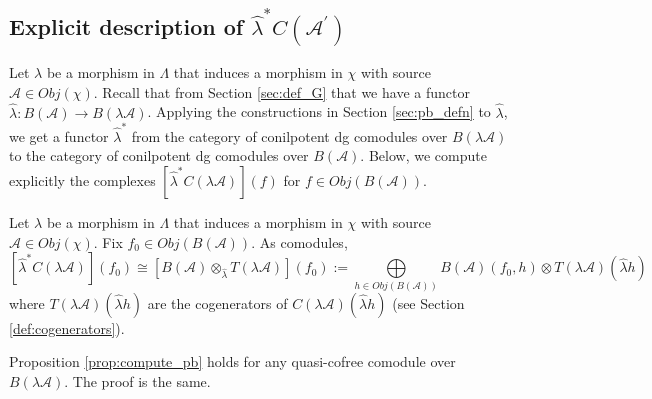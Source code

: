 \subsection{Explicit description of 
$\hat{\lambda}^*C(\mathcal{A}^\prime)$}
Let $\lambda$ be a morphism in $\Lambda$ 
that induces a morphism in $\chi$ with source 
$\mathcal{A} \in Obj(\chi)$. 
Recall that from Section \ref{sec:def_G}
that we have a functor $\hat{\lambda}: 
B(\mathcal{A}) \to B(\lambda \mathcal{A})$. 
Applying the constructions in 
Section \ref{sec:pb_defn} to
$\hat{\lambda}$, we get a functor 
$\hat{\lambda}^*$ from the 
category of conilpotent 
dg comodules over $B(\lambda \mathcal{A})$ 
to the category 
of conilpotent dg comodules 
over $B(\mathcal{A})$. 
Below, we compute explicitly the complexes 
$[\hat{\lambda}^*C(\lambda \mathcal{A})](f)$ 
for $f \in Obj(B(\mathcal{A}))$.
%
\begin{prop}\label{prop:compute_pb}
Let $\lambda$ be a morphism in $\Lambda$ 
that induces a morphism in $\chi$ with source 
$\mathcal{A} \in Obj(\chi)$. 
Fix $f_0 \in Obj(B(\mathcal{A}))$. As comodules,
\begin{equation}\label{eq:compute_pb}
[\hat{\lambda}^*C(\lambda \mathcal{A})](f_0) \cong 
[B(\mathcal{A}) \otimes_{\hat{\lambda}} T(\lambda \mathcal{A})](f_0) := 
\bigoplus \limits_{h \in Obj(B(\mathcal{A}))}
B(\mathcal{A})(f_0, h) \otimes T(\lambda \mathcal{A})(\hat{\lambda} h)
\end{equation}
where $T(\lambda \mathcal{A})(\hat{\lambda} h)$ are the cogenerators of 
$C(\lambda \mathcal{A})(\hat{\lambda} h)$ 
(see Section \ref{def:cogenerators}).
\end{prop}
%
\begin{rem}
Proposition \ref{prop:compute_pb} holds 
for any quasi-cofree comodule over 
$B(\lambda \mathcal{A})$. The proof is the same.
\end{rem}
%
